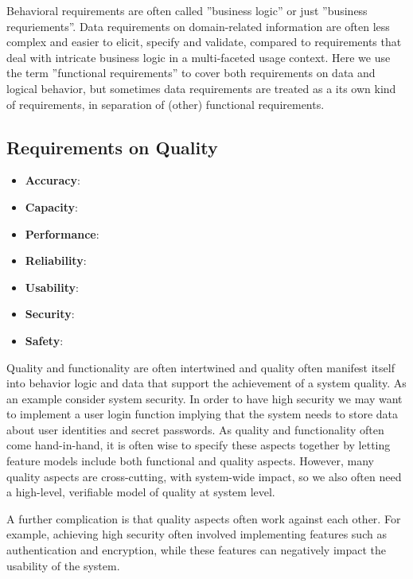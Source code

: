Behavioral requirements are often called ''business logic'' or just ''business requriements''. Data requirements on domain-related information are often less complex and easier to elicit, specify and validate, compared to requirements that deal with intricate business logic in a multi-faceted usage context. Here we use the term ''functional requirements'' to cover both requirements on data and logical behavior, but sometimes data requirements are treated as a its own kind of requirements, in separation of (other) functional requirements. 

\subsection{Requirements on Quality}

\begin{itemize}
  \item \textbf{Accuracy}:
  \item \textbf{Capacity}:
  \item \textbf{Performance}:
  \item \textbf{Reliability}:
  \item \textbf{Usability}:
  \item \textbf{Security}:
  \item \textbf{Safety}:
\end{itemize}

Quality and functionality are often intertwined and quality often manifest itself into behavior logic and data that support the achievement of a system quality. As an example consider system security. In order to have high security we may want to implement a user login function implying that the system needs to store data about user identities and secret passwords. As quality and functionality often come hand-in-hand, it is often wise to specify these aspects together by letting feature models include both functional and quality aspects. However, many quality aspects are cross-cutting, with system-wide impact, so we also often need a high-level, verifiable model of quality at system level. 

A further complication is that quality aspects often work against each other. For example, achieving high security often involved implementing features such as authentication and encryption, while these features can negatively impact the usability of the system.
